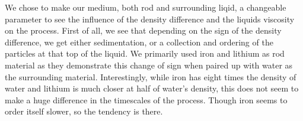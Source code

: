 
We chose to make our medium, both rod and surrounding liqid, a changeable parameter to see the influence of the density difference and the liquids viscosity on the process.
First of all, we see that depending on the sign of the density difference, we get either sedimentation, or a collection and ordering of the particles at that top of the liquid. We primarily used iron and lithium as rod material as they demonstrate this change of sign when paired up with water as the surrounding material. Interestingly, while iron has eight times the density of water and lithium is much closer at half of water's density, this does not seem to make a huge difference in the timescales of the process. Though iron seems to order itself slower, so the tendency is there.\\
\begin{figure}
  \begin{minipage}[t]{0.45\textwidth}
  \end{minipage}
  \hfill
  \begin{minipage}[t]{0.45\textwidth}

\end{minipage}
\end{figure}
